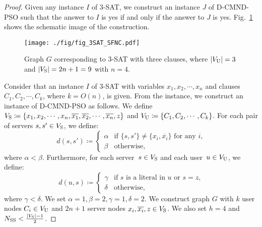 \documentclass[10pt, letterpaper]{IEEEtran}
\begin{document}
\begin{CJK}{UTF8}{ipxm}
\begin{proof}
  Given any instance $I$ of 3-SAT, we construct an instance $J$ of D-CMND-PSO such that the answer to $I$ is yes if and only if the answer to $J$ is yes. %
  Fig.~\ref{fig:3SAT_SFNC} shows the schematic image of the construction.

  \begin{figure}[!t]
    \begin{center}
      \texttt{[image: ./fig/fig\_3SAT\_SFNC.pdf]}
    \end{center}
    \caption{Graph $G$ corresponding to 3-SAT with three clauses, where $|V_{\rm U}|=3$ and $|V_{\rm S}|=2n+1=9$ with $n=4$.}
    \label{fig:3SAT_SFNC}
  \end{figure}

  Consider that an instance $I$ of 3-SAT with variables $x_1, x_2,\cdots, x_n$ and clauses $C_1, C_2,\cdots, C_k$, where $k=O(n)$, is given.
  From the instance, we construct an instance of D-CMND-PSO as follows.
  We define $V_{\rm{S}} \coloneq \{x_1, x_2,\cdots, x_n, \overline{x_1},\overline{x_2},\cdots,\overline{x_n},z\}$ and $V_{\rm{U}} \coloneq \{C_1,C_2,\cdots,C_k\}$.
  For each pair of servers $s, s'\in V_{\rm{S}}$, we define:
  \begin{equation}
    d(s, s')\coloneqq
    \begin{cases}
      \alpha & \text{if $\{s, s'\}\neq \{x_i,\overline{x_i}\}$ for any $i$,}\\
      \beta& \text{otherwise,}
    \end{cases}
  \end{equation}
  where $\alpha < \beta$. Furthermore, for each server~$s\in V_{\rm{S}}$ and each user~$u\in V_{\rm{U}}$, we define:
  \begin{equation}
    d(u,s)\coloneqq
    \begin{cases}
      \gamma & \text{if $s$ is a literal in $u$ or $s=z$,}\\
      \delta& \text{otherwise,}
    \end{cases}
  \end{equation}
  where $\gamma < \delta$.
  We set $\alpha = 1, \beta = 2, \gamma = 1, \delta = 2$.
  We construct graph $G$ with $k$ user nodes $C_i \in V_{\rm{U}}$ and $2n+1$ server nodes $x_i, \overline{x_i}, z \in V_{\rm{S}}$.
  We also set $h=4$ and $N_{\mathrm{SS}} < \frac{|V_{\rm{S}}|-1}{2}$.


\end{proof}
\end{CJK}
\end{document}
